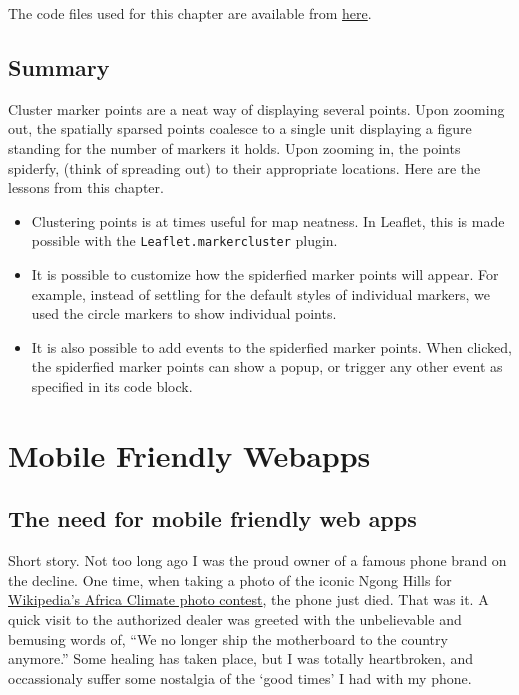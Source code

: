 \documentclass[
]{book}
\begin{document}
The code files used for this chapter are available from \href{https://github.com/sammigachuhi/my-leaflet-project/tree/main/my-leaflet-code/chapter-10-Cluster_marker_points}{here}.

\hypertarget{summary-8}{%
\section{Summary}\label{summary-8}}

Cluster marker points are a neat way of displaying several points. Upon zooming out, the spatially sparsed points coalesce to a single unit displaying a figure standing for the number of markers it holds. Upon zooming in, the points spiderfy, (think of spreading out) to their appropriate locations. Here are the lessons from this chapter.

\begin{itemize}
\item
  Clustering points is at times useful for map neatness. In Leaflet, this is made possible with the \texttt{Leaflet.markercluster} plugin.
\item
  It is possible to customize how the spiderfied marker points will appear. For example, instead of settling for the default styles of individual markers, we used the circle markers to show individual points.
\item
  It is also possible to add events to the spiderfied marker points. When clicked, the spiderfied marker points can show a popup, or trigger any other event as specified in its code block.
\end{itemize}

\hypertarget{mobile-friendly-webapps}{%
\chapter{Mobile Friendly Webapps}\label{mobile-friendly-webapps}}

\hypertarget{the-need-for-mobile-friendly-web-apps}{%
\section{The need for mobile friendly web apps}\label{the-need-for-mobile-friendly-web-apps}}

Short story. Not too long ago I was the proud owner of a famous phone brand on the decline. One time, when taking a photo of the iconic Ngong Hills for \href{https://www.wikilovesafrica.net/wikipedias-photographic-competition-focuses-on-africas-climate-weather/}{Wikipedia's Africa Climate photo contest}, the phone just died. That was it. A quick visit to the authorized dealer was greeted with the unbelievable and bemusing words of, ``We no longer ship the motherboard to the country anymore.'' Some healing has taken place, but I was totally heartbroken, and occassionaly suffer some nostalgia of the `good times' I had with my phone.
\end{document}
